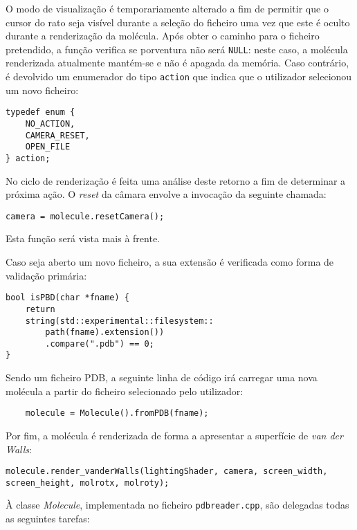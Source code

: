 O modo de visualização é temporariamente alterado a fim de permitir que o cursor do rato seja visível durante a seleção do ficheiro uma vez que este é oculto durante a renderização da molécula. Após obter o caminho para o ficheiro pretendido, a função verifica se porventura não será \verb|NULL|: neste caso, a molécula renderizada atualmente mantém-se e não é apagada da memória. Caso contrário, é devolvido um enumerador do tipo \verb|action| que indica que o utilizador selecionou um novo ficheiro:

\begin{verbatim}
typedef enum {
    NO_ACTION,
    CAMERA_RESET,
    OPEN_FILE
} action;
\end{verbatim}

No ciclo de renderização é feita uma análise deste retorno a fim de determinar a próxima ação. O \textit{reset} da câmara envolve a invocação da seguinte chamada:

\begin{verbatim}
camera = molecule.resetCamera();
\end{verbatim}

Esta função será vista mais à frente.

Caso seja aberto um novo ficheiro, a sua extensão é verificada como forma de validação primária:

\begin{verbatim}
bool isPBD(char *fname) {
    return
    string(std::experimental::filesystem::
        path(fname).extension())
        .compare(".pdb") == 0;
}
\end{verbatim}

Sendo um ficheiro \ac{PDB}, a seguinte linha de código irá carregar uma nova molécula a partir do ficheiro selecionado pelo utilizador:

\begin{verbatim}
    molecule = Molecule().fromPDB(fname);
\end{verbatim}

Por fim, a molécula é renderizada de forma a apresentar a superfície de \textit{van der Walls}:

\begin{verbatim}
molecule.render_vanderWalls(lightingShader, camera, screen_width, screen_height, molrotx, molroty);
\end{verbatim}

À classe \textit{Molecule}, implementada no ficheiro \verb|pdbreader.cpp|, são delegadas todas as seguintes tarefas:

